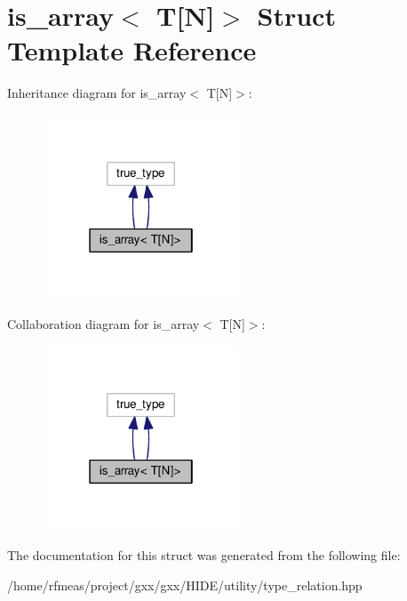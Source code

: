 \hypertarget{structis__array_3_01T[N]_4}{}\section{is\+\_\+array$<$ T\mbox{[}N\mbox{]}$>$ Struct Template Reference}
\label{structis__array_3_01T[N]_4}


Inheritance diagram for is\+\_\+array$<$ T\mbox{[}N\mbox{]}$>$\+:
\nopagebreak
\begin{figure}[H]
\begin{center}
\leavevmode
\includegraphics[width=166pt]{structis__array_3_01T[N]_4__inherit__graph}
\end{center}
\end{figure}


Collaboration diagram for is\+\_\+array$<$ T\mbox{[}N\mbox{]}$>$\+:
\nopagebreak
\begin{figure}[H]
\begin{center}
\leavevmode
\includegraphics[width=166pt]{structis__array_3_01T[N]_4__coll__graph}
\end{center}
\end{figure}


The documentation for this struct was generated from the following file\+:\begin{DoxyCompactItemize}
\item 
/home/rfmeas/project/gxx/gxx/\+H\+I\+D\+E/utility/type\+\_\+relation.\+hpp\end{DoxyCompactItemize}
